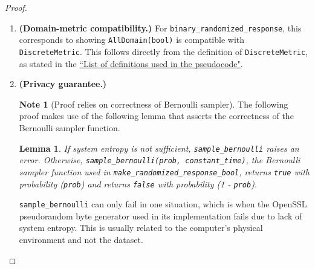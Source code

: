\documentclass[11pt,a4paper]{article}
\newtheorem{lemma}[theorem]{Lemma}
\newcommand{\vicki}[1]{{ {\color{olive}{(vicki)~#1}}}}
\theoremstyle{definition}
\newtheorem{note}{Note}
\begin{document}
\begin{proof}
\begin{enumerate}
    
    

    \item \textbf{(Domain-metric compatibility.)} For \texttt{binary\_randomized\_response}, this corresponds to showing \texttt{AllDomain(bool)} is compatible with \texttt{DiscreteMetric}. This follows directly from the definition of \texttt{DiscreteMetric}, as stated in the \href{https://github.com/opendp/whitepapers/blob/pseudocode-defns/pseudocode-defns/pseudocode_defns.pdf}{``List of definitions used in the pseudocode"}.
    
    \item \textbf{(Privacy guarantee.)} 
    
    \begin{tcolorbox}
\begin{note}[Proof relies on correctness of Bernoulli sampler]
The following proof makes use of the following lemma that asserts the correctness of the Bernoulli sampler function.
    \begin{lemma}
    If system entropy is not sufficient, \texttt{sample\_bernoulli} raises an error. Otherwise, \texttt{sample\_bernoulli(prob, constant\_time)}, the Bernoulli sampler function used in \texttt{make\_randomized\_response\_bool}, returns \texttt{true} with probability (\texttt{prob}) and returns  \texttt{false} with probability (1 - \texttt{prob}).  \vicki{wording on this?} 
    \end{lemma}
\end{note}
\end{tcolorbox}
    \texttt{sample\_bernoulli} can only fail in one situation, which is when the OpenSSL pseudorandom byte generator used in its implementation fails due to lack of system entropy. This is usually related to the computer's physical environment and not the dataset. \vicki{how modular should this be - should we mention fill bytes or just defer to the sample bernoulli proof?}
    

\end{enumerate}
\end{proof}
\end{document}
